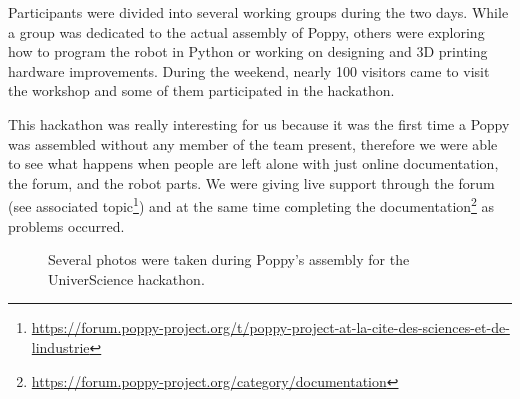 Participants were divided into several working groups during the two days. While a group was dedicated to the actual assembly of Poppy, others were exploring how to program the robot in Python or working on designing and 3D printing hardware improvements. During the weekend, nearly 100 visitors came to visit the workshop and some of them participated in the hackathon.

This hackathon was really interesting for us because it was the first time a Poppy was assembled without any member of the team present, therefore we were able to see what happens when people are left alone with just online documentation, the forum, and the robot parts.
We were giving live support through the forum (see associated topic\footnote{\url{https://forum.poppy-project.org/t/poppy-project-at-la-cite-des-sciences-et-de-lindustrie}}) and at the same time completing the documentation\footnote{\url{https://forum.poppy-project.org/category/documentation}} as problems occurred.

\begin{figure}[p]
\centering
    \hfill
    \hfill
    \newline
    \hfill
    \newline
    \hfill
    \newline
    \hfill
    \caption{Several photos were taken during Poppy's assembly for the UniverScience hackathon.}
    \label{fig:universience_workshop}
\end{figure}

